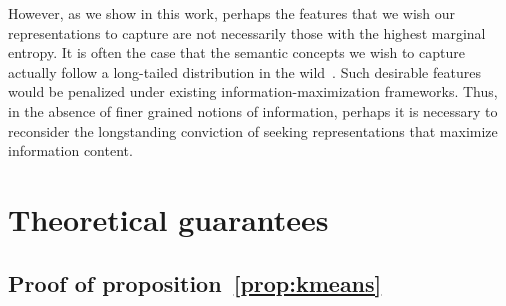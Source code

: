 \documentclass{article} %
\begin{document}
However, as we show in this work, perhaps the features that we wish our representations to capture are not necessarily those with the highest marginal entropy.
It is often the case that the semantic concepts we wish to capture actually follow a long-tailed distribution in the wild~.
Such desirable features would be penalized under existing information-maximization frameworks.
Thus, in the absence of finer grained notions of information, perhaps it is necessary to reconsider the longstanding conviction of seeking representations that maximize information content.


\section{Theoretical guarantees}
\label{apndx:proofs}

\subsection{Proof of proposition~\ref{prop:kmeans}}
\label{proof:kmeans1}
\end{document}
